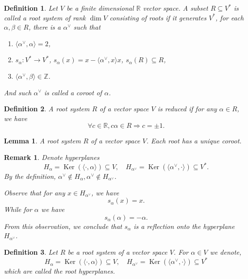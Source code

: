 \documentclass{article}
\newtheorem{definition}{Definition}[section]
\newtheorem{lemma}{Lemma}[section]
\newtheorem{remark}{Remark}[section]
\numberwithin{equation}{section}
\DeclareMathOperator{\Ker}{Ker}
\begin{document}
\begin{definition}
Let $V$ be a finite dimensional $\mathbb{R}$ vector space. A subset $R\subseteq V^*$ is called a root system of rank $\dim V$ consisting of roots if it generates $V^*$, for each $\alpha,\beta\in R$, there is a $\alpha^\lor$ such that
\begin{enumerate}
\item $\langle\alpha^\lor,\alpha\rangle = 2$,
\item $s_\alpha:V^*\to V^*$, $s_\alpha(x) = x-\langle\alpha^\lor,x\rangle x$, $s_\alpha(R)\subseteq R$,
\item $\langle\alpha^\lor,\beta\rangle\in\mathbb{Z}$.
\end{enumerate}
And such $\alpha^\lor$ is called a coroot of $\alpha$.
\end{definition}

\begin{definition}
A root system $R$ of a vector space $V$ is reduced if for any $\alpha\in R$, we have
\begin{equation*}
\forall c\in\mathbb{R}, c\alpha\in R\Rightarrow c = \pm1.
\end{equation*}
\end{definition}

\begin{lemma}
A root system $R$ of a vector space $V$. Each root has a unique coroot.
\end{lemma}

\begin{remark}
Denote hyperplanes
\begin{equation*}
H_\alpha = \Ker(\langle \cdot,\alpha\rangle)\subseteq V, \quad H_{\alpha^\lor} = \Ker(\langle\alpha^\lor,\cdot\rangle)\subseteq V^*.
\end{equation*}
By the definition, $\alpha^\lor\not\in H_\alpha,\alpha^\lor\not\in H_{\alpha^\lor}$.\\
\par Observe that for any $x\in H_{\alpha^\lor}$, we have
\begin{equation*}
s_\alpha(x) = x.
\end{equation*}
While for $\alpha$ we have
\begin{equation*}
s_\alpha(\alpha) = -\alpha.
\end{equation*}
From this observation, we conclude that $s_\alpha$ is a reflection onto the hyperplane $H_{\alpha^\lor}$.
\end{remark}

\begin{definition}
Let $R$ be a root system of a vector space $V$. For $\alpha\in V$ we denote,
\begin{equation*}
H_\alpha = \Ker(\langle \cdot,\alpha\rangle)\subseteq V, \quad H_{\alpha^\lor} = \Ker(\langle\alpha^\lor,\cdot\rangle)\subseteq V^*
\end{equation*}
which are called the root hyperplanes.
\end{definition}
\end{document}
